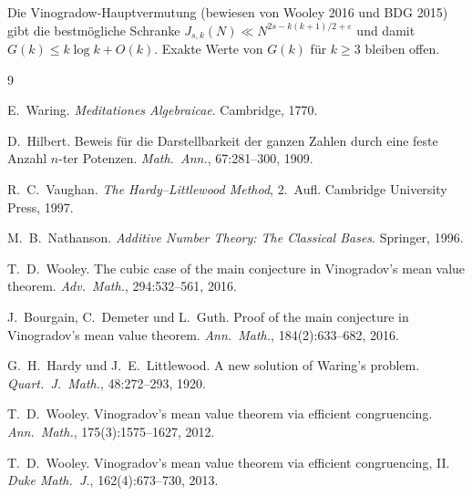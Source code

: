 \documentclass[12pt,a4paper]{amsart}
\theoremstyle{definition}
\begin{document}
Die Vinogradow-Hauptvermutung (bewiesen von Wooley 2016 und BDG 2015)
gibt die bestmögliche Schranke $J_{s,k}(N) \ll N^{2s-k(k+1)/2+\varepsilon}$
und damit $G(k) \leq k\log k + O(k)$.  Exakte Werte von $G(k)$ für $k \geq 3$
bleiben offen.

\begin{thebibliography}{9}

E.~Waring.
\newblock \emph{Meditationes Algebraicae}.
\newblock Cambridge, 1770.

D.~Hilbert.
\newblock Beweis für die Darstellbarkeit der ganzen Zahlen durch eine feste
  Anzahl $n$-ter Potenzen.
\newblock \emph{Math.\ Ann.}, 67:281--300, 1909.

R.~C.~Vaughan.
\newblock \emph{The Hardy--Littlewood Method}, 2.~Aufl.
\newblock Cambridge University Press, 1997.

M.~B.~Nathanson.
\newblock \emph{Additive Number Theory: The Classical Bases}.
\newblock Springer, 1996.

T.~D.~Wooley.
\newblock The cubic case of the main conjecture in Vinogradov's mean value theorem.
\newblock \emph{Adv.\ Math.}, 294:532--561, 2016.

J.~Bourgain, C.~Demeter und L.~Guth.
\newblock Proof of the main conjecture in Vinogradov's mean value theorem.
\newblock \emph{Ann.\ Math.}, 184(2):633--682, 2016.

G.~H.~Hardy und J.~E.~Littlewood.
\newblock A new solution of Waring's problem.
\newblock \emph{Quart.\ J.\ Math.}, 48:272--293, 1920.

T.~D.~Wooley.
\newblock Vinogradov's mean value theorem via efficient congruencing.
\newblock \emph{Ann.\ Math.}, 175(3):1575--1627, 2012.

T.~D.~Wooley.
\newblock Vinogradov's mean value theorem via efficient congruencing, II.
\newblock \emph{Duke Math.\ J.}, 162(4):673--730, 2013.

\end{thebibliography}
\end{document}
